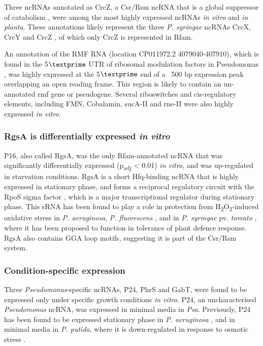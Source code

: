 Three ncRNAs annotated as CrcZ, a Csr$/$Rsm ncRNA that is a global suppressor of catabolism \citep{Filiatrault2013-us}, were among the most highly expressed ncRNAs \textit{in vitro} and \textit{in planta}. These annotations likely represent the three \textit{P. syringae} ncRNAs CrcX, CrcY and CrcZ \citep{Filiatrault2013-us}, of which only CrcZ is represented in Rfam. 

An annotation of the RMF RNA (location CP011972.2 4079040-407910), which is found in the 5$\textprime$ UTR of ribosomal modulation factors in Pseudomonas \citep{Weinberg2010-gu}, was highly expressed at the 5$\textprime$ end of a ~500 bp expression peak overlapping an open reading frame. This region is likely to contain an un-annotated rmf gene or pseudogene. Several riboswitches and cis-regulatory elements, including FMN, Cobalamin, sucA-II and rne-II were also highly expressed \textit{in vitro}. 

\subsubsection{RgsA is differentially expressed \textit{in vitro}} 
P16, also called RgsA, was the only Rfam-annotated ncRNA that was significantly differentially expressed (p\textsubscript{adj} < 0.01) \textit{in vitro}, and was up-regulated in starvation conditions. RgsA is a short Hfq-binding ncRNA that is highly expressed in stationary phase, and forms a reciprocal regulatory circuit with the RpoS sigma factor \citep{Lu2018-qy}, which is a major transcriptional regulator during stationary phase. This sRNA has been found to play a role in protection from H\textsubscript{2}O\textsubscript{2}-induced oxidative stress in \textit{P. aeruginosa}, \textit{P. fluorescens} \citep{Gonzalez2008-yl}, and in \textit{P. syringae} pv. \textit{tomato} \citep{Park2013-pb}, where it has been proposed to function in tolerance of plant defence response. RgsA also contains GGA loop motifs, suggesting it is part of the Csr/Rsm system.

\subsubsection{Condition-specific expression}

Three \textit{Pseudomonas}-specific ncRNAs, P24, PhrS and GabT, were found to be expressed only under specific growth conditions \textit{in vitro}. P24, an uncharacterised \textit{Pseudomonas} ncRNA, was expressed in minimal media in \textit{Psa}. Previously, P24 has been found to be expressed stationary phase in \textit{P. aeruginosa} \citep{Livny2006-nf}, and in minimal media in \textit{P. putida}, where it is down-regulated in response to osmotic stress \citep{Bojanovic2017-ph}.  

